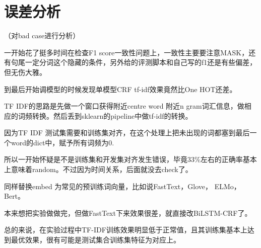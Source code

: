 \section{误差分析}
\label{sec:analysis}

（对bad case进行分析）


一开始花了挺多时间在检查F1 score一致性问题上，一致性主要要注意MASK，还有句尾一定分词这个隐藏的条件，另外给的评测脚本和自己写的f1还是有些偏差，但无伤大雅。

到最后开始调模型的时候发现单模型CRF tf-idf效果竟然比One HOT还差。

TF IDF的思路是先做一个窗口获得附近centre word 附近n gram词汇信息，做相应的词频转换。然后丢到sklearn的pipeline中做tf-idf的转换。

因为TF IDF 测试集需要和训练集对齐，在这个处理上把未出现的词都塞到最后一个word的dict中，赋予所有词频为0.

所以一开始怀疑是不是训练集和开发集对齐发生错误，毕竟33\%左右的正确率基本上意味着random。不过因为时间关系，后面就没去check了。

同样替换embed 为常见的预训练词向量，比如说FastText，Glove， ELMo， Bert。

本来想把实验做做完，但做FastText下来效果很差，就直接改BiLSTM-CRF了。

总的来说，在实验过程中TF-IDF训练效果明显低于正常值，且其训练集基本上达到最优效果，很有可能是测试集合训练集特征为对应上。
